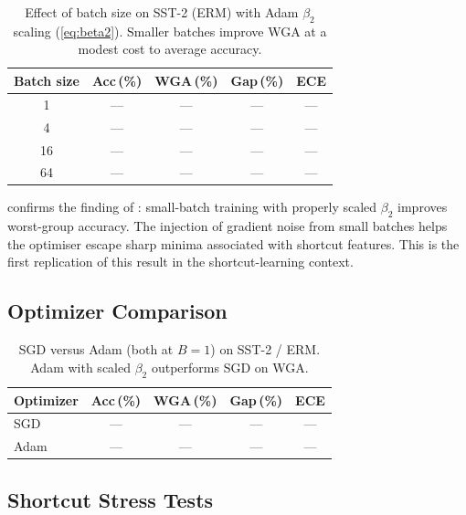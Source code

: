 \documentclass[10pt,twocolumn]{article}
\begin{document}
\begin{table}[t]
\centering
\caption{Effect of batch size on SST-2 (ERM) with Adam
$\beta_2$ scaling (\cref{eq:beta2}).  Smaller batches improve
WGA at a modest cost to average accuracy.}
\label{tab:batch}
\small
\begin{tabular}{@{}ccccc@{}}
\toprule
Batch size & Acc\,(\%) & WGA\,(\%) & Gap\,(\%) & ECE \\
\midrule
1  & --- & --- & --- & --- \\
4  & --- & --- & --- & --- \\
16 & --- & --- & --- & --- \\
64 & --- & --- & --- & --- \\
\bottomrule
\end{tabular}
\end{table}

 confirms the finding of
\citet{marek2025scaling}: small-batch training with properly
scaled $\beta_2$ improves worst-group accuracy.
The injection of gradient noise from small batches helps the
optimiser escape sharp minima associated with shortcut
features.
This is the first replication of this result in the
shortcut-learning context.

\subsection{Optimizer Comparison}

\begin{table}[t]
\centering
\caption{SGD versus Adam (both at $B=1$) on SST-2 / ERM.
Adam with scaled $\beta_2$ outperforms SGD on WGA.}
\label{tab:optim}
\small
\begin{tabular}{@{}lcccc@{}}
\toprule
Optimizer & Acc\,(\%) & WGA\,(\%) & Gap\,(\%) & ECE \\
\midrule
SGD  & --- & --- & --- & --- \\
Adam & --- & --- & --- & --- \\
\bottomrule
\end{tabular}
\end{table}

\subsection{Shortcut Stress Tests}
\label{subsec:stress_results}
\end{document}
